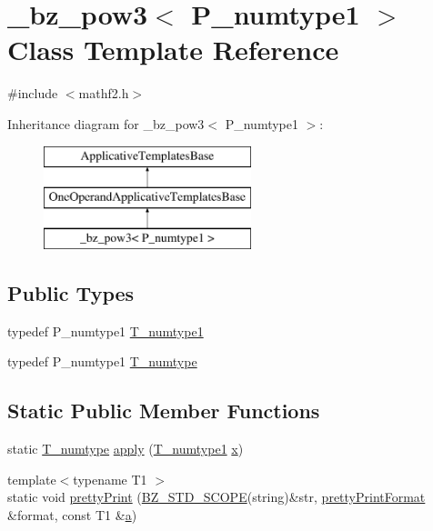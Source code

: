 \hypertarget{class__bz__pow3}{}\section{\+\_\+bz\+\_\+pow3$<$ P\+\_\+numtype1 $>$ Class Template Reference}
\label{class__bz__pow3}


{\ttfamily \#include $<$mathf2.\+h$>$}

Inheritance diagram for \+\_\+bz\+\_\+pow3$<$ P\+\_\+numtype1 $>$\+:\begin{figure}[H]
\begin{center}
\leavevmode
\includegraphics[height=3.000000cm]{class__bz__pow3}
\end{center}
\end{figure}
\subsection*{Public Types}
\begin{DoxyCompactItemize}
\item 
typedef P\+\_\+numtype1 \hyperlink{class__bz__pow3_a38dbd4cbc3fb0e9e9193888897381ee6}{T\+\_\+numtype1}
\item 
typedef P\+\_\+numtype1 \hyperlink{class__bz__pow3_accfaa530b6ee5c874c85266ed3b4bf6d}{T\+\_\+numtype}
\end{DoxyCompactItemize}
\subsection*{Static Public Member Functions}
\begin{DoxyCompactItemize}
\item 
static \hyperlink{class__bz__pow3_accfaa530b6ee5c874c85266ed3b4bf6d}{T\+\_\+numtype} \hyperlink{class__bz__pow3_a273832d9f33f397c2c6c9278bb5eaed4}{apply} (\hyperlink{class__bz__pow3_a38dbd4cbc3fb0e9e9193888897381ee6}{T\+\_\+numtype1} \hyperlink{vecnorm1_8cc_ac73eed9e41ec09d58f112f06c2d6cb63}{x})
\item 
{\footnotesize template$<$typename T1 $>$ }\\static void \hyperlink{class__bz__pow3_a4f9f46997daf79abf2bebf997009b01e}{pretty\+Print} (\hyperlink{numinquire_8h_a2b24ffc3b4ef9803956bc7715c6c7b83}{B\+Z\+\_\+\+S\+T\+D\+\_\+\+S\+C\+O\+P\+E}(string)\&str, \hyperlink{classprettyPrintFormat}{pretty\+Print\+Format} \&format, const T1 \&\hyperlink{gen__mat5files_8m_aae328bf20413f220e38aec4d95bfd6da}{a})
\end{DoxyCompactItemize}


